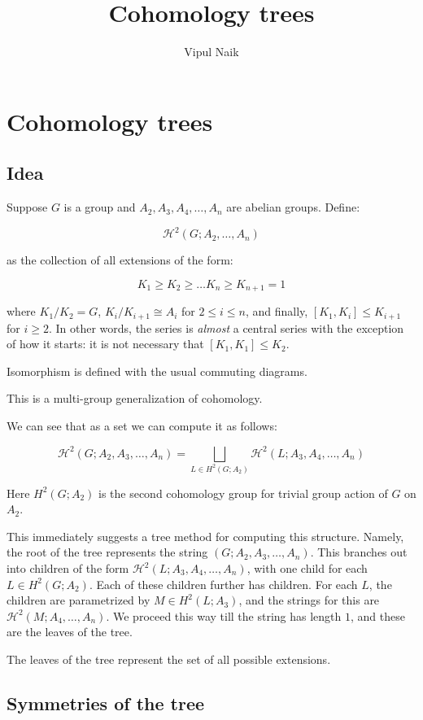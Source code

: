\documentclass[10pt]{amsart}
\title{Cohomology trees}
\author{Vipul Naik}
\begin{document}
\maketitle


\section{Cohomology trees}

\subsection{Idea}

Suppose $G$ is a group and $A_2,A_3,A_4,\dots, A_n$ are abelian
groups. Define:

$$\mathcal{H}^2(G;A_2,\dots,A_n)$$

as the collection of all extensions of the form:

$$K_1 \ge K_2 \ge \dots K_n \ge K_{n+1}= 1$$

where $K_1/K_2 = G$, $K_i/K_{i+1} \cong A_i$ for $2 \le i \le n$, and
finally, $[K_1,K_i] \le K_{i+1}$ for $i \ge 2$. In other words, the
series is {\em almost} a central series with the exception of how it
starts: it is not necessary that $[K_1,K_1] \le K_2$.

Isomorphism is defined with the usual commuting diagrams.

This is a multi-group generalization of cohomology.

We can see that as a set we can compute it as follows:

$$\mathcal{H}^2(G;A_2,A_3,\dots,A_n) = \bigsqcup_{L \in H^2(G;A_2)} \mathcal{H}^2(L;A_3,A_4,\dots,A_n)$$

Here $H^2(G;A_2)$ is the second cohomology group for trivial group action of $G$ on $A_2$.

This immediately suggests a tree method for computing this
structure. Namely, the root of the tree represents the string
$(G;A_2,A_3,\dots,A_n)$. This branches out into children of the form
$\mathcal{H}^2(L;A_3,A_4,\dots,A_n)$, with one child for each $L \in
H^2(G;A_2)$. Each of these children further has children. For each
$L$, the children are parametrized by $M \in H^2(L;A_3)$, and the
strings for this are $\mathcal{H}^2(M;A_4,\dots,A_n)$. We proceed this
way till the string has length $1$, and these are the leaves of the tree.

The leaves of the tree represent the set of all possible extensions.

\subsection{Symmetries of the tree}
\end{document}

